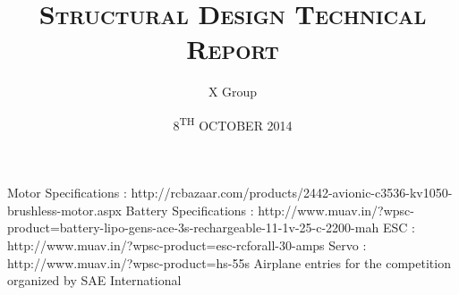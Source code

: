 \documentclass{iitm_course_report}
\begin{document}
\title{\textsc{\MakeUppercase Structural Design Technical Report}}
\author{X Group}
\date{8\textsuperscript{TH} OCTOBER 2014}
\maketitle
\cleardoublepage
%

\cleardoublepage
%

\cleardoublepage
\begin{singlespace}
\tableofcontents
\thispagestyle{empty}
\cleardoublepage
\listoftables
{}
\cleardoublepage
\listoffigures
{}
\end{singlespace}
\cleardoublepage

\cleardoublepage
\footskip=0.2in

\cleardoublepage

\cleardoublepage

\cleardoublepage

\cleardoublepage

\cleardoublepage

\cleardoublepage
%
\begin{singlespace}


\end{singlespace}
\begin{thebibliography}{10}

   Motor Specifications : http://rcbazaar.com/products/2442-avionic-c3536-kv1050-brushless-motor.aspx
   Battery Specifications : http://www.muav.in/?wpsc-product=battery-lipo-gens-ace-3s-rechargeable-11-1v-25-c-2200-mah
   ESC : http://www.muav.in/?wpsc-product=esc-rcforall-30-amps
   Servo : http://www.muav.in/?wpsc-product=hs-55s
   Airplane entries for the competition organized by SAE International

\end{thebibliography}
  \renewcommand{\theequation}{A-\arabic{equation}}
  \renewcommand{\thesection}{A.\arabic{section}}
  \renewcommand{\thetable}{A.\arabic{table}}
  \renewcommand{\thefigure}{A.\arabic{figure}}
  \setcounter{equation}{0}  %
%
\end{document}
